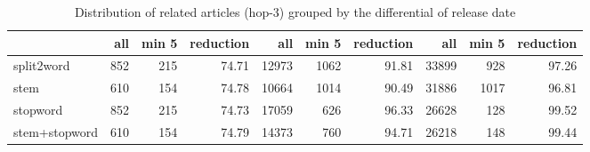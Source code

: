 \begin{table}[!htb]
    \centering
\begin{tabular}{|l|rrr|rrr|rrr|}
\hline
               &       all &     min 5 &   reduction &         all &      min 5 &   reduction &         all &      min 5 &   reduction \\
\hline
 split2word    & 852 & 215 &       74.71 & 12973 & 1062 &       91.81 & 33899 &  928 &       97.26 \\
 stem          & 610 & 154 &       74.78 & 10664 & 1014 &       90.49 & 31886 & 1017 &       96.81 \\
 stopword      & 852 & 215 &       74.73 & 17059 &  626 &       96.33 & 26628 &  128 &       99.52 \\
 stem+stopword & 610 & 154 &       74.79 & 14373 &  760 &       94.71 & 26218 &  148 &       99.44 \\
\hline
\end{tabular}
    \caption{Distribution of related articles (hop-3) grouped by the differential of release date}
    \label{tab:release_dist_related}
\end{table}
